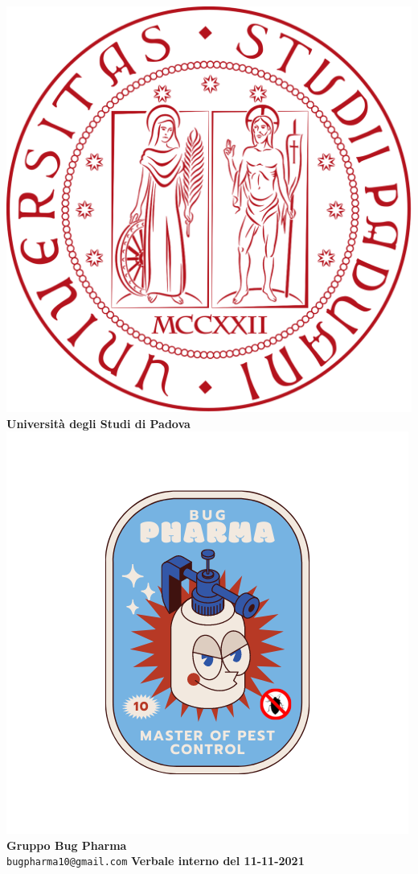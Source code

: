 \documentclass[11pt]{article}
\begin{document}
	\thispagestyle{empty}
	\begin{titlepage}
		\begin{center}
			\includegraphics[scale = 0.05]{../../Res/logo_unipd.png}\\
			\bigskip
			\large \textbf{Università degli Studi di Padova} \\
			\vfill
			\includegraphics[scale = 0.7]{../../Res/BugPharma_Logo.png}\\
			\huge \textbf{Gruppo Bug Pharma} \\
			\vfill
			\large \texttt{bugpharma10@gmail.com}
			\vfill
			\Huge \textbf{Verbale interno del 11-11-2021}\\
			

\end{center}
\end{titlepage}
\end{document}
